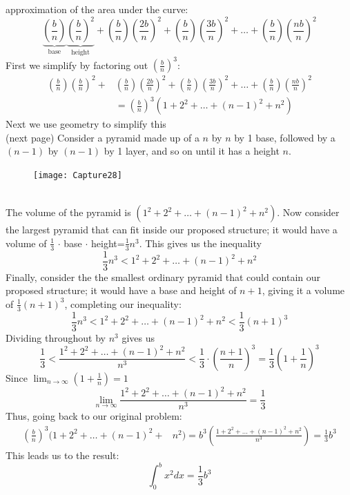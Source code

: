 \documentclass{report}
\begin{document}
approximation of the area under the curve:
\begin{equation*}
\underbrace{\left(\frac{b}{n}\right)}_{\text{base}}
\underbrace{\left(\frac{b}{n}\right)^2}_{\text{height}}
+\left(\frac{b}{n}\right)\left(\frac{2b}{n}\right)^2
+\left(\frac{b}{n}\right)\left(\frac{3b}{n}\right)^2
+\ldots+\left(\frac{b}{n}\right)\left(\frac{nb}{n}\right)^2
\end{equation*}
First we simplify by factoring out $\left(\frac{b}{n}\right)^3$:
\begin{align*}
\left(\frac{b}{n}\right)\left(\frac{b}{n}\right)^2+&
\left(\frac{b}{n}\right)\left(\frac{2b}{n}\right)^2+
\left(\frac{b}{n}\right)\left(\frac{3b}{n}\right)^2+
\ldots+\left(\frac{b}{n}\right)\left(\frac{nb}{n}\right)^2\\
&=\left(\frac{b}{n}\right)^3(1+2^2+\ldots+(n-1)^2+n^2)
\end{align*}
Next we use geometry to simplify this\\
(next page)
\newpage
\noindent Consider a pyramid made up of a $n$ by $n$ by 1 base, 
followed by a $(n-1)$ by $(n-1)$ by 1 layer, and so on until it has a height $n$.
\begin{figure}[h]
\texttt{[image: Capture28]}\\
\centering
{}
\end{figure}\\
The volume of the pyramid is $(1^2+2^2+\ldots+(n-1)^2+n^2)$. 
Now consider the largest pyramid that can fit inside our proposed structure; it would
have a volume of $\frac{1}{3}$ $\cdot$ base $\cdot$ height=$\frac{1}{3}n^3$. This gives us the inequality
\begin{equation*}
\frac{1}{3}n^3<1^2+2^2+\ldots+(n-1)^2+n^2
\end{equation*}
Finally, consider the the smallest ordinary pyramid that could contain our proposed structure;
it would have a base and height of $n+1$, giving it a volume of $\frac{1}{3}(n+1)^3$,
completing our inequality:
\begin{equation*}
\frac{1}{3}n^3<1^2+2^2+\ldots+(n-1)^2+n^2
<\frac{1}{3}(n+1)^3
\end{equation*}
Dividing throughout by $n^3$ gives us
\begin{equation*}
\frac{1}{3}<\frac{1^2+2^2+\ldots+(n-1)^2+n^2}{n^3}
<\frac{1}{3}\cdot\left(\frac{n+1}{n}\right)^3
=\frac{1}{3}\left(1+\frac{1}{n}\right)^3
\end{equation*}
Since $\lim_{n\to\infty}\left(1+\frac{1}{n}\right)=1$
\begin{equation*}
\lim_{n\to\infty}\frac{1^2+2^2+\ldots+(n-1)^2+n^2}{n^3}=\frac{1}{3}
\end{equation*}
Thus, going back to our original problem:
\begin{align*}
\left(\frac{b}{n}\right)^3(1+2^2+\ldots+(n-1)^2+&n^2)
=b^3\left(\frac{1+2^2+\ldots+(n-1)^2+n^2}{n^3}\right)
=\frac{1}{3}b^3
\end{align*}
This leads us to the result:
\begin{equation*}
\int_0^bx^2dx=\frac{1}{3}b^3
\end{equation*}
\newpage
\end{document}
